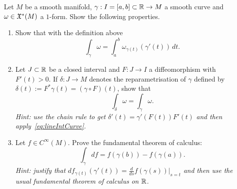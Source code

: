\begin{exercise}\label{exe:FTC}
  Let $M$ be a smooth manifold, $\gamma: I = [a,b]\subset \mathbb{R} \to M$ a smooth curve and $\omega\in\mathfrak{X}^*(M)$ a $1$-form.
  Show the following properties.
  \begin{enumerate}
    \item Show that with the definition above
          \begin{equation}\label{eq:lineIntCurve}
            \int_\gamma \omega = \int_a^b \omega_{\gamma(t)}(\gamma'(t))\, dt.
          \end{equation}
    \item Let $J\subset\mathbb{R}$ be a closed interval  and $F: J\to I$ a diffeomorphism with $F'(t) > 0$.
          If $\delta : J \to M$ denotes the reparametrisation of $\gamma$ defined by $\delta(t) := F^*\gamma(t) = (\gamma\circ F)(t)$, show that
          \begin{equation}
            \int_\delta \omega = \int_\gamma \omega.
          \end{equation}
          \textit{\small Hint: use the chain rule to get $\delta'(t) = \gamma'(F(t))F'(t)$ and then apply~\eqref{eq:lineIntCurve}.}
    \item Let $f\in C^\infty(M)$. Prove the fundamental theorem of calculus:
          \begin{equation}
            \int_\gamma df = f(\gamma(b)) - f(\gamma(a)).
          \end{equation}
          \textit{\small Hint: justify that $df_{\gamma(t)}(\gamma'(t)) = \frac{d}{ds}f(\gamma(s))\big|_{s=t}$ and then use the usual fundamental theorem of calculus on $\mathbb{R}$.}
  \end{enumerate}
\end{exercise}


